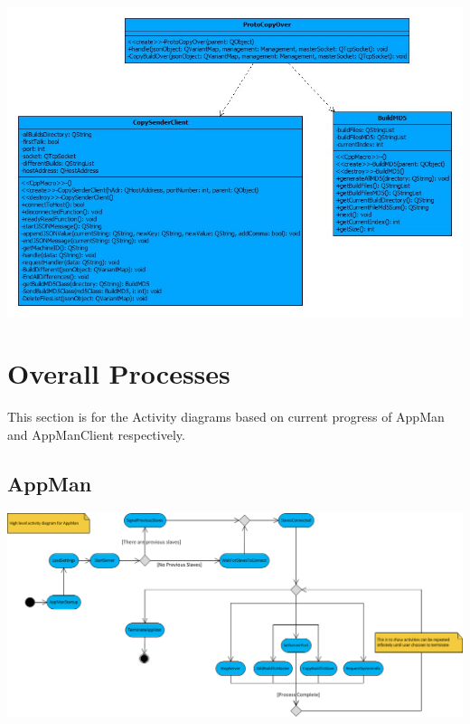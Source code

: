 \documentclass[a4paper,12pt,final]{article}
\begin{document}
\begin{center}
	\includegraphics[angle = 90,scale = 0.7]{Part3.jpg}
\end{center}


\newpage
\section{Overall Processes}
This section is for the Activity diagrams based on current progress of AppMan and AppManClient respectively.
\subsection{AppMan}
\begin{center}
\includegraphics[angle = 90, scale=0.7]{MasterMainActivity.png}
\end{center}
\newpage
\end{document}
